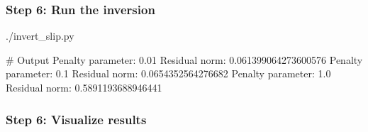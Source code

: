 \documentclass[aspectratio=169]{beamer}
\begin{document}
\begin{frame}[fragile]
  \frametitle{Step 6: Run the inversion}
  \summary{}

\begin{bashcode}
  ./invert_slip.py

  # Output
  Penalty parameter:  0.01
  Residual norm:      0.061399064273600576
  Penalty parameter:  0.1
  Residual norm:      0.0654352564276682
  Penalty parameter:  1.0
  Residual norm:      0.5891193688946441
\end{bashcode}
  
\end{frame}


\begin{frame}
  \frametitle{Step 6: Visualize results}

  
\end{frame}

\end{document}
